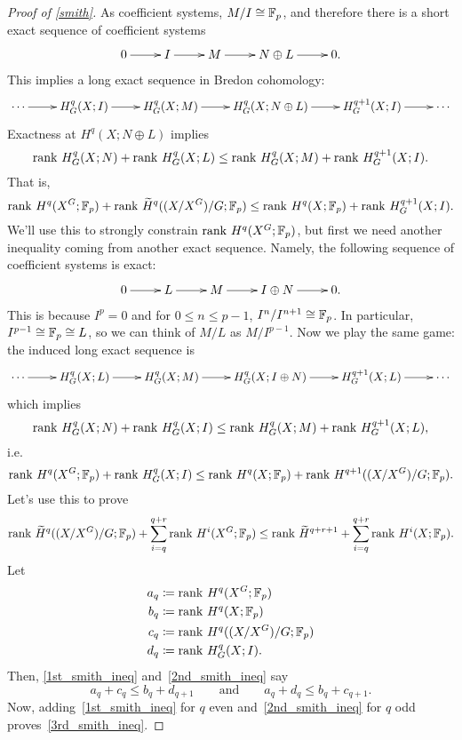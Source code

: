 \begin{proof}[Proof of \cref{smith}]
As coefficient systems, $M/I\cong\mathbb F_p$, and therefore there is a short exact sequence of coefficient systems
\[\shortexact{I}{M}{N\oplus L}.\]
This implies a long exact sequence in Bredon cohomology:
\[\xymatrix{
	\dotsb\ar[r] & H_G^q(X;I)\ar[r] & H_G^q(X;M)\ar[r] & H_G^q(X;N\oplus L)\ar[r] & H_G^{q+1}(X;I)\ar[r] & \dotsb
}\]
Exactness at $H^q(X;N\oplus L)$ implies
\[\operatorname{rank\,} H_G^q(X;N) + \operatorname{rank\,} H_G^q(X;L) \le \operatorname{rank\,} H_G^q(X;M) + \operatorname{rank\,} H_G^{q+1}(X;I).\]
That is,
\begin{equation}
\label{1st_smith_ineq}
\operatorname{rank\,} H^q(X^G;\mathbb F_p) + \operatorname{rank\,}\widetilde H^q((X/X^G)/G;\mathbb F_p) \le \operatorname{rank\,} H^q(X;\mathbb F_p) + \operatorname{rank\,} H_G^{q+1}(X;I).
\end{equation}
We'll use this to strongly constrain $\operatorname{rank\,} H^q(X^G;\mathbb F_p)$, but first we need another inequality coming from
another exact sequence. Namely, the following sequence of coefficient systems is exact:
\[\shortexact{L}{M}{I\oplus N}.\]
This is because $I^p = 0$ and for $0\le n\le p-1$, $I^n/I^{n+1}\cong\mathbb F_p$. In particular, $I^{p-1}\cong\mathbb F_p\cong
L$, so we can think of $M/L$ as $M/I^{p-1}$. Now we play the same game: the induced long exact sequence is
\[\xymatrix{
	\dotsb\ar[r] & H_G^q(X;L)\ar[r] & H_G^q(X;M)\ar[r] & H_G^q(X;I\oplus N)\ar[r] & H_G^{q+1}(X;L)\ar[r] & \dotsb
}\]
which implies
\[\operatorname{rank\,} H_G^q(X;N) + \operatorname{rank\,} H_G^q(X;I) \le \operatorname{rank\,} H_G^q(X;M) + \operatorname{rank\,} H_G^{q+1}(X;L),\]
i.e.
\begin{equation}
\label{2nd_smith_ineq}
\operatorname{rank\,} H^q(X^G;\mathbb F_p) + \operatorname{rank\,} H_G^q(X;I) \le \operatorname{rank\,} H^q(X;\mathbb F_p) + \operatorname{rank\,} H^{q+1}((X/X^G)/G;\mathbb F_p).
\end{equation}
Let's use this to prove
\begin{equation}
\label{3rd_smith_ineq}
\operatorname{rank\,} \widetilde H^q((X/X^G)/G;\mathbb F_p) + \sum_{i=q}^{q+r} \operatorname{rank\,} H^i(X^G;\mathbb F_p) \le \operatorname{rank\,}\widetilde H^{q+r+1} + \sum_{i=q}^{q+r}\operatorname{rank\,}
H^i(X;\mathbb F_p).
\end{equation}
Let
\begin{align*}
	a_q &\coloneqq \operatorname{rank\,} H^q(X^G;\mathbb F_p)\\
	b_q &\coloneqq \operatorname{rank\,} H^q(X;\mathbb F_p)\\
	c_q &\coloneqq \operatorname{rank\,} H^q((X/X^G)/G;\mathbb F_p)\\
	d_q &\coloneqq \operatorname{rank\,} H_G^q(X;I).
\end{align*}
Then, \eqref{1st_smith_ineq} and~\eqref{2nd_smith_ineq} say
\[a_q + c_q\le b_q + d_{q+1}\qquad\text{and}\qquad a_q + d_q \le b_q + c_{q+1}.\]
Now, adding~\eqref{1st_smith_ineq} for $q$ even and~\eqref{2nd_smith_ineq} for $q$ odd
proves~\eqref{3rd_smith_ineq}.


\end{proof}
